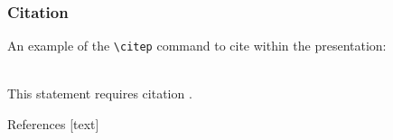 \documentclass[aspectratio=169]{beamer}
\numberwithin{figure}{section}
\numberwithin{equation}{section}
\begin{document}
\begin{frame}[fragile] %
\frametitle{Citation}
An example of the \verb|\citep| command to cite within the presentation:\\~

This statement requires citation \citep{skogestad2003simple}.
\end{frame}


\begin{frame}[allowframebreaks]{References}
 [text]
 
 {}
\end{frame}


\ThankYouFrame

\end{document}
